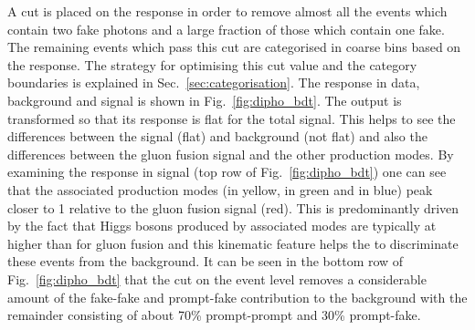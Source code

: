 A cut is placed on the \BDT response in order to remove almost all the events which contain two fake photons and a large fraction of those which contain one fake. The remaining events which pass this cut are categorised in coarse bins based on the \BDT response. The strategy for optimising this cut value and the category boundaries is explained in Sec.~\ref{sec:categorisation}. The \BDT response in data, background and signal is shown in Fig.~\ref{fig:dipho_bdt}. The \BDT output is transformed so that its response is flat for the total signal. This helps to see the differences between the signal (flat) and background (not flat) and also the differences between the gluon fusion signal and the other production modes. By examining the \BDT response in signal (top row of Fig.~\ref{fig:dipho_bdt}) one can see that the associated production modes (\VBF in yellow, \VH in green and \ttH in blue) peak closer to 1 relative to the gluon fusion signal (red). This is predominantly driven by the fact that Higgs bosons produced by associated modes are typically at higher \pT than for gluon fusion and this kinematic feature helps the \BDT to discriminate these events from the background. It can be seen in the bottom row of Fig.~\ref{fig:dipho_bdt} that the cut on the event level \BDT removes a considerable amount of the fake-fake and prompt-fake contribution to the background with the remainder consisting of about 70\% prompt-prompt and 30\% prompt-fake.

